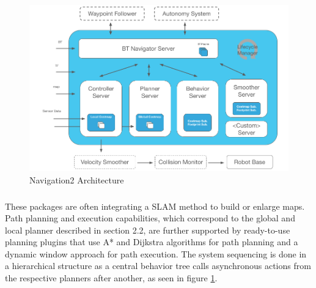 \begin{figure}[ht]
	\includegraphics[width=1.0\textwidth]{images/nav2_architecture.png}
	\caption{Navigation2 Architecture \cite{macenski2020}}
	\label{fig:nav_architecture}
\end{figure}
\subparagraph*{}
These packages are often integrating a SLAM method to build or enlarge maps. Path planning and execution capabilities, which correspond to the global and local planner described in section 2.2, are further supported by ready-to-use planning plugins that use A* and Dijkstra algorithms for path planning and a dynamic window approach for path execution. The system sequencing is done in a hierarchical structure as a central behavior tree calls asynchronous actions from the respective planners after another, as seen in figure \ref{fig:nav_architecture}. 

